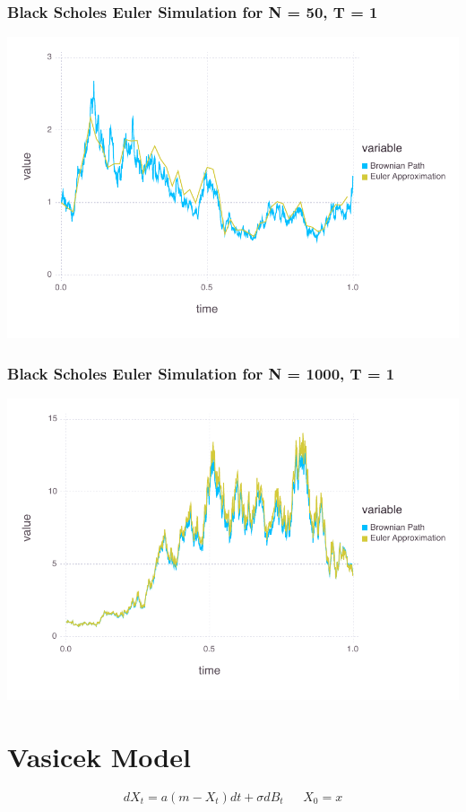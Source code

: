 \documentclass[a4paper,12pt]{article}
\begin{document}
\subsubsection*{Black Scholes Euler Simulation for N = 50, T = 1}
\includegraphics[width=\linewidth]{figures/problemset_3_1.pdf}



\subsubsection*{Black Scholes Euler Simulation for N = 1000, T = 1}
\includegraphics[width=\linewidth]{figures/problemset_4_1.pdf}


\section{Vasicek Model}
$$
dX_t = a(m - X_t)dt + \sigma dB_t \ \ \ \ \ \ \ X_0 = x
$$
%
\end{document}
